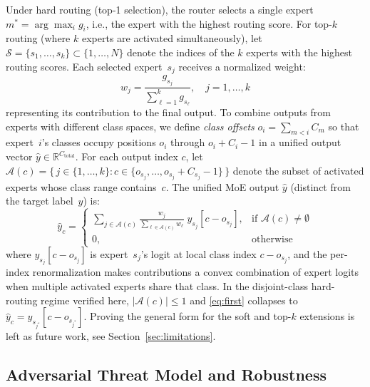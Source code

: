 \documentclass[runningheads]{llncs}
\begin{document}
Under hard routing (top-1 selection), the router selects a single expert $m^* = \arg\max_i g_i$, i.e., the expert with the highest routing score. For top\nobreakdash-$k$ routing (where $k$ experts are activated simultaneously), let $\mathcal{S} = \{s_1, \ldots, s_k\} \subset \{1, \ldots, N\}$ denote the indices of the $k$ experts with the highest routing scores. Each selected expert~$s_j$ receives a normalized weight:
\begin{equation*}
    w_j = \frac{g_{s_j}}{\sum_{\ell=1}^{k} g_{s_\ell}}, \quad j = 1, \ldots, k
\end{equation*}
representing its contribution to the final output. To combine outputs from experts with different class spaces, we define \emph{class offsets} $o_i = \sum_{m<i} C_m$ so that expert~$i$'s classes occupy positions $o_i$ through $o_i + C_i - 1$ in a unified output vector $\hat{y} \in \mathbb{R}^{C_{\text{total}}}$. For each output index $c$, let $\mathcal{A}(c) = \{\, j \in \{1,\ldots,k\} : c \in \{o_{s_j}, \ldots, o_{s_j} + C_{s_j} - 1\}\,\}$ denote the subset of activated experts whose class range contains~$c$. The unified MoE output $\hat{y}$ (distinct from the target label~$y$) is:
\begin{equation}
\label{eq:first}
    \hat{y}_c = \begin{cases}
        \displaystyle \sum_{j \in \mathcal{A}(c)} \frac{w_j}{\sum_{\ell \in \mathcal{A}(c)} w_\ell}\; y_{s_j}[c - o_{s_j}], & \text{if } \mathcal{A}(c) \neq \emptyset \\[4pt]
        0, & \text{otherwise}
    \end{cases}
\end{equation}
where $y_{s_j}[c - o_{s_j}]$ is expert~$s_j$'s logit at local class index $c - o_{s_j}$, and the per-index renormalization makes contributions a convex combination of expert logits when multiple activated experts share that class. In the disjoint-class hard-routing regime verified here, $|\mathcal{A}(c)| \leq 1$ and \eqref{eq:first} collapses to $\hat{y}_c = y_{s_{j^*}}[c - o_{s_{j^*}}]$. Proving the general form for the soft and top-$k$ extensions is left as future work, see Section~\ref{sec:limitations}.

\subsection{Adversarial Threat Model and Robustness}
\label{sec:threat-model}
\end{document}
